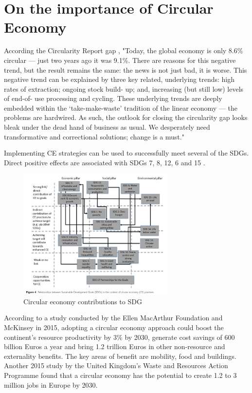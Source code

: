 \section{On the importance of Circular Economy}
According  the Circularity Report gap \parencite{CircleEconomy2020}, "Today, the global economy is only 8.6\% circular — just two years ago it was 9.1\%. There are reasons for this negative trend, but the result remains the same: the news is not just bad, it is worse. This negative trend can be explained by three key related, underlying trends: high rates of extraction; ongoing stock build- up; and, increasing (but still low) levels of end-of- use processing and cycling. These underlying trends are deeply embedded within the ‘take-make-waste’ tradition of the linear economy — the problems are hardwired. As such, the outlook for closing the circularity gap looks bleak under the dead hand of business as usual. We desperately need transformative and correctional solutions; change is a must."\par
Implementing CE strategies can be used to successfully meet several of the SDGs. Direct positive effects are associated with SDGs 7, 8, 12, 6 and 15 \parencite{Schroeder2018}. 

\begin{figure}[h!]
    \centering
    \includegraphics[width=0.7\textwidth]{sections/asset/ce_relation.PNG}
    \caption{Circular economy contributions to SDG}
    \label{fig:badbad}
\end{figure}


According to a study conducted by the Ellen MacArthur Foundation and McKinsey in 2015, adopting a circular economy approach could boost the continent’s resource productivity by 3\% by 2030, generate cost savings of 600 billion Euros a year and bring 1.2 trillion Euros in other non-resource and externality benefits. The key areas of benefit are mobility, food and buildings. Another 2015 study by the United Kingdom’s Waste and Resources Action Programme found that a circular economy has the potential to create 1.2 to 3 million jobs in Europe by 2030. \par


